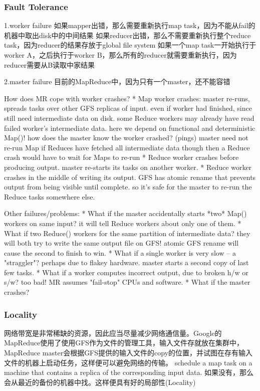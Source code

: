 \subsubsection{Fault Tolerance}
1.worker failure
如果mapper出错，那么需要重新执行map task，因为不能从fail的机器中取出disk中的中间结果
如果reducer出错，那么不需要重新执行整个reduce task，因为reducer的结果存放于global file system
如果一个map task一开始执行于worker A，之后执行于worker B，那么所有的reducer就需要重新执行，因为reducer需要从B读取中家结果

2.master failure
目前的MapReduce中，因为只有一个master，还不能容错

How does MR cope with worker crashes?
  * Map worker crashes:
    master re-runs, spreads tasks over other GFS replicas of input.
      even if worker had finished, since still need intermediate data on disk.
    some Reduce workers may already have read failed worker's intermediate data.
      here we depend on functional and deterministic Map()!
    how does the master know the worker crashed? (pings)
    master need not re-run Map if Reduces have fetched all intermediate data
      though then a Reduce crash would have to wait for Maps to re-run
  * Reduce worker crashes before producing output.
    master re-starts its tasks on another worker.
  * Reduce worker crashes in the middle of writing its output.
    GFS has atomic rename that prevents output from being visible until complete.
    so it's safe for the master to re-run the Reduce tasks somewhere else.

Other failures/problems:
  * What if the master accidentally starts *two* Map() workers on same input?
    it will tell Reduce workers about only one of them.
  * What if two Reduce() workers for the same partition of intermediate data?
    they will both try to write the same output file on GFS!
    atomic GFS rename will cause the second to finish to win.
  * What if a single worker is very slow -- a "straggler"?
    perhaps due to flakey hardware.
    master starts a second copy of last few tasks.
  * What if a worker computes incorrect output, due to broken h/w or s/w?
    too bad! MR assumes "fail-stop" CPUs and software.
  * What if the master crashes?

\subsubsection{Locality}
网络带宽是非常稀缺的资源，因此应当尽量减少网络通信量。Google的MapReduce使用了使用GFS作为文件的管理工具，输入文件存就放在集群中，MapReduce master会根据GFS提供的输入文件的copy的位置，并试图在存有输入文件的机器上启动任务，这样便可以避免网络的传输。
schedule a map task on a machine that contains a replica of the corresponding input data.
如果没有，那么会从最近的备份的机器中找。这样便具有好的局部性(Locality)

